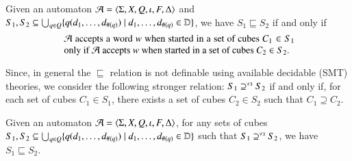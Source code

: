 \documentclass{llncs}
\begin{document}
\begin{definition}\label{def:coverage}
  Given an automaton $\mathcal{A} = \langle \Sigma,X,Q,\iota,F,\Delta \rangle$ and
  $S_1, S_2 \subseteq \bigcup_{q \in Q} \{ q(d_1,\ldots,d_{\#(q)})
    \mid d_1,\ldots,d_{\#(q)} \in \mathbb{D} \}$, we have $S_1 \sqsubseteq
  S_2$ if and only if 
  \begin{equation}\label{eq:po}
    \text{
      \begin{minipage}{0.7\textwidth}
        $\A$ accepts a word $w$ when started in a set of cubes $C_1
        \in S_1$ only if $\A$ accepts $w$ when started in a set of
        cubes $C_2 \in S_2$.
    \end{minipage}} 
  \end{equation}
\end{definition}
Since, in general the $\sqsubseteq$ relation is not definable using
available decidable (SMT) theories, we consider the following stronger
relation: $S_1 \supseteq^{\scriptscriptstyle\forall\exists} S_2$ if and only if, for each set of cubes
$C_1 \in S_1$, there exists a set of cubes $C_2 \in S_2$ such that
$C_1 \supseteq C_2$.

\begin{lemma}\label{lemma:coverage}
  Given an automaton $\mathcal{A} = \langle \Sigma,X,Q,\iota,F,\Delta \rangle$, for any
  sets of cubes $S_1, S_2 \subseteq \bigcup_{q \in Q}
  \{ q(d_1,\ldots,d_{\#(q)}) \mid d_1,\ldots,d_{\#(q)} \in \mathbb{D} \}$
  such that $S_1 \supseteq^{\scriptscriptstyle\forall\exists} S_2$, we have $S_1 \sqsubseteq S_2$.
\end{lemma}
\proof{  
\qed}

 

\end{document}
